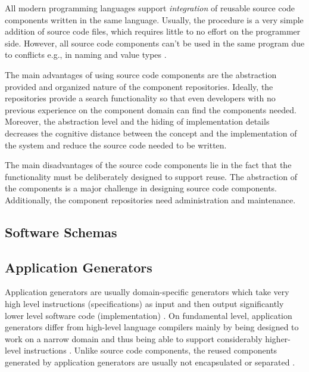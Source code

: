 All modern programming languages support \emph{integration} of reusable source code components written in the same language. Usually, the procedure is a very simple addition of source code files, which requires little to no effort on the programmer side. However, all source code components can't be used in the same program due to conflicts e.g., in naming and value types \citep[chap.~5]{krueger_software_1992}.

The main advantages of using source code components are the abstraction provided and organized nature of the component repositories. Ideally, the repositories provide a search functionality so that even developers with no previous experience on the component domain can find the components needed. Moreover, the abstraction level and the hiding of implementation details decreases the cognitive distance between the concept and the implementation of the system and reduce the source code needed to be written.

The main disadvantages of the source code components lie in the fact that the functionality must be deliberately designed to support reuse. The abstraction of the components is a major challenge \citep[chap.~5]{krueger_software_1992} in designing source code components. Additionally, the component repositories need administration and maintenance.

\subsection{Software Schemas}


\subsection{Application Generators}

Application generators are usually domain-specific generators which take very high level instructions (specifications) as input and then output significantly lower level software code (implementation) \citep[chap.~7]{cleaveland_building_1988,krueger_software_1992}. On fundamental level, application generators differ from high-level language compilers mainly by being designed to work on a narrow domain and thus being able to support considerably higher-level instructions \citep[chap.~7]{krueger_software_1992}. Unlike source code components, the reused components generated by application generators are usually not encapsulated or separated \citep[chap.~3]{sametinger_software_1997}.

